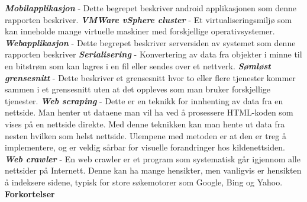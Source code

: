 \documentclass[../main.tex]{subfiles}
\begin{document}
\textbf{\textit{Mobilapplikasjon}} - Dette begrepet beskriver android applikasjonen som denne rapporten beskriver.\newline
\newline
\textbf{\textit{VMWare vSphere cluster}} - Et virtualiseringsmiljø som kan inneholde mange virtuelle maskiner med forskjellige operativsystemer.  \newline
\newline
\textbf{\textit{Webapplikasjon}} - Dette begrepet beskriver serversiden av systemet som denne rapporten beskriver\newline
\newline
\textbf{\textit{Serialisering}} - Konvertering av data fra objekter i minne til en bitstrøm som kan lagres i en fil eller sendes over et nettverk. \newline
\newline
\textbf{\textit{Sømløst grensesnitt}} - Dette beskriver et grensesnitt hvor to eller flere tjenester kommer sammen i et grensesnitt uten at det oppleves som man bruker forskjellige tjenester.\newline
\newline
\textbf{\textit{Web scraping}} - Dette er en teknikk for innhenting av data fra en nettside. Man henter ut dataene man vil ha ved å prosessere HTML-koden som vises på en nettside direkte. Med denne teknikken kan man hente ut data fra nesten hvilken som helst nettside. Ulempene med metoden er at den er treg å implementere, og er veldig sårbar for visuelle forandringer hos kildenettsiden. \newline
\newline
\textbf{\textit{Web crawler}} - En web crawler er et program som systematisk går igjennom alle nettsider på Internett. Denne kan ha mange hensikter, men vanligvis er hensikten å indeksere sidene, typisk for store søkemotorer som Google, Bing og Yahoo.\newline
\newline
{\bfseries \large Forkortelser}\newline
\end{document}
